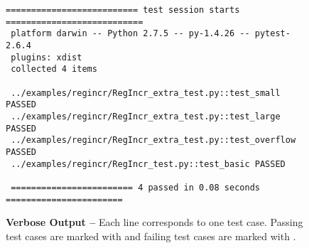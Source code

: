 
\begin{figure}
  \vspace{0.05in}

  \footnotesize
  \begin{Verbatim}[xleftmargin=0.8in]
 ========================== test session starts ===========================
 platform darwin -- Python 2.7.5 -- py-1.4.26 -- pytest-2.6.4
 plugins: xdist
 collected 4 items

 ../examples/regincr/RegIncr_extra_test.py::test_small PASSED
 ../examples/regincr/RegIncr_extra_test.py::test_large PASSED
 ../examples/regincr/RegIncr_extra_test.py::test_overflow PASSED
 ../examples/regincr/RegIncr_test.py::test_basic PASSED

 ======================== 4 passed in 0.08 seconds =======================
  \end{Verbatim}
  \vspace{-0.1in}

  \caption{\textbf{ Verbose Output --} Each line corresponds
    to one test case. Passing test cases are marked with  and
    failing test cases are marked with .}
  \label{fig-tut3-pytest-verbose-output}

\end{figure}
